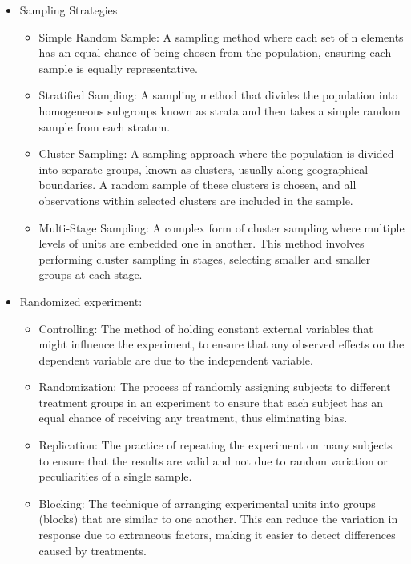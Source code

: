 \documentclass{article}
\begin{document}
\begin{itemize}
\item Sampling Strategies
    \begin{itemize}
        \item Simple Random Sample: A sampling method where each set of n elements has an equal chance of being chosen from the population, ensuring each sample is equally representative.
        \item Stratified Sampling: A sampling method that divides the population into homogeneous subgroups known as strata and then takes a simple random sample from each stratum.
        \item Cluster Sampling: A sampling approach where the population is divided into separate groups, known as clusters, usually along geographical boundaries. A random sample of these clusters is chosen, and all observations within selected clusters are included in the sample.
        \item Multi-Stage Sampling: A complex form of cluster sampling where multiple levels of units are embedded one in another. This method involves performing cluster sampling in stages, selecting smaller and smaller groups at each stage.
    \end{itemize}
\item Randomized experiment:
    \begin{itemize}
        \item Controlling: The method of holding constant external variables that might influence the experiment, to ensure that any observed effects on the dependent variable are due to the independent variable.
        \item Randomization: The process of randomly assigning subjects to different treatment groups in an experiment to ensure that each subject has an equal chance of receiving any treatment, thus eliminating bias.
        \item Replication: The practice of repeating the experiment on many subjects to ensure that the results are valid and not due to random variation or peculiarities of a single sample.
        \item Blocking: The technique of arranging experimental units into groups (blocks) that are similar to one another. This can reduce the variation in response due to extraneous factors, making it easier to detect differences caused by treatments.
    \end{itemize}

\end{itemize}
\end{document}
